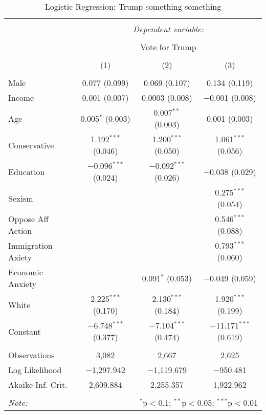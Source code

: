 
\begin{table}[!htbp] \centering 
  \caption{Logistic Regression: Trump something something} 
  \label{tab: regs} 
\begin{tabular}{@{\extracolsep{5pt}}lccc} 
\\[-1.8ex]\hline 
\hline \\[-1.8ex] 
 & \multicolumn{3}{c}{\textit{Dependent variable:}} \\ 
\cline{2-4} 
\\[-1.8ex] & \multicolumn{3}{c}{Vote for Trump} \\ 
\\[-1.8ex] & (1) & (2) & (3)\\ 
\hline \\[-1.8ex] 
 Male & 0.077 (0.099) & 0.069 (0.107) & 0.134 (0.119) \\ 
  Income & 0.001 (0.007) & 0.0003 (0.008) & $-$0.001 (0.008) \\ 
  Age & 0.005$^{*}$ (0.003) & 0.007$^{**}$ (0.003) & 0.001 (0.003) \\ 
  Conservative & 1.192$^{***}$ (0.046) & 1.200$^{***}$ (0.050) & 1.061$^{***}$ (0.056) \\ 
  Education & $-$0.096$^{***}$ (0.024) & $-$0.092$^{***}$ (0.026) & $-$0.038 (0.029) \\ 
  Sexism &  &  & 0.275$^{***}$ (0.054) \\ 
  Oppose Aff Action &  &  & 0.546$^{***}$ (0.088) \\ 
  Immigration Axiety &  &  & 0.793$^{***}$ (0.060) \\ 
  Economic Anxiety &  & 0.091$^{*}$ (0.053) & $-$0.049 (0.059) \\ 
  White & 2.225$^{***}$ (0.170) & 2.130$^{***}$ (0.184) & 1.920$^{***}$ (0.199) \\ 
  Constant & $-$6.748$^{***}$ (0.377) & $-$7.104$^{***}$ (0.474) & $-$11.171$^{***}$ (0.619) \\ 
 \hline \\[-1.8ex] 
Observations & 3,082 & 2,667 & 2,625 \\ 
Log Likelihood & $-$1,297.942 & $-$1,119.679 & $-$950.481 \\ 
Akaike Inf. Crit. & 2,609.884 & 2,255.357 & 1,922.962 \\ 
\hline 
\hline \\[-1.8ex] 
\textit{Note:}  & \multicolumn{3}{r}{$^{*}$p$<$0.1; $^{**}$p$<$0.05; $^{***}$p$<$0.01} \\ 
\end{tabular} 
\end{table} 
